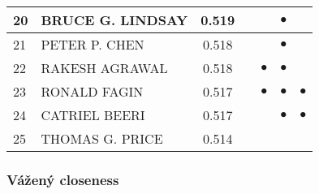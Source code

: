 \documentclass[12pt,titlepage]{report}
\begin{document}
\begin{center}
\begin{tabular}{|l|l|c|c|c|c|c|}
\hline
20 & BRUCE G. LINDSAY & 0.519&         &         &$\bullet$&         \\
\hline
21 & PETER P. CHEN & 0.518&           &           & $\bullet$ &           \\
\hline
22 & RAKESH AGRAWAL & 0.518&&$\bullet$&$\bullet$&         \\
\hline
23 & RONALD FAGIN & 0.517&           & $\bullet$ & $\bullet$ & $\bullet$ \\
\hline
24 & CATRIEL BEERI & 0.517&         &         &$\bullet$&$\bullet$\\
\hline
25 & THOMAS G. PRICE & 0.514 & & & & \\
\hline
\end{tabular}
\end{center}

\subsubsection{Vážený closeness}
\end{document}
